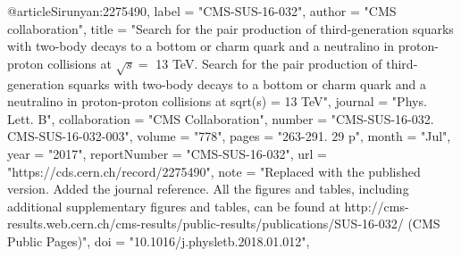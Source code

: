 @article{Sirunyan:2275490,
      label          = "CMS-SUS-16-032",
      author        = "{CMS collaboration}",
      title         = "{Search for the pair production of third-generation
                       squarks with two-body decays to a bottom or charm quark and
                       a neutralino in proton-proton collisions at $ \sqrt{s} = $
                       13 TeV. Search for the pair production of third-generation
                       squarks with two-body decays to a bottom or charm quark and
                       a neutralino in proton-proton collisions at sqrt(s) = 13
                       TeV}",
      journal       = "Phys. Lett. B",
      collaboration = "CMS Collaboration",
      number        = "CMS-SUS-16-032. CMS-SUS-16-032-003",
      volume        = "778",
      pages         = "263-291. 29 p",
      month         = "Jul",
      year          = "2017",
      reportNumber  = "CMS-SUS-16-032",
      url           = "https://cds.cern.ch/record/2275490",
      note          = "Replaced with the published version. Added the journal
                       reference. All the figures and tables, including additional
                       supplementary figures and tables, can be found at
                       http://cms-results.web.cern.ch/cms-results/public-results/publications/SUS-16-032/
                       (CMS Public Pages)",
      doi           = "10.1016/j.physletb.2018.01.012",
}

